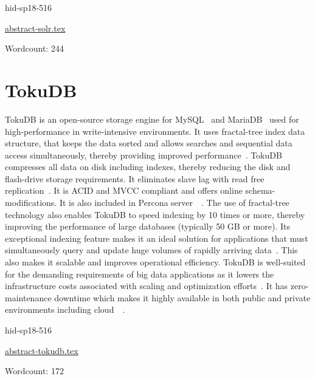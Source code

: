 \begin{IU}

hid-sp18-516

\href{https://github.com/cloudmesh-community/hid-sp18-516/blob/master//technology/abstract-solr.tex}{abstract-solr.tex}

 

Wordcount: 244

\end{IU}

\section{TokuDB}

TokuDB is an open-source storage engine for 
MySQL~\cite{hid-sp18-516-www-wiki-mysql} and 
MariaDB~\cite{hid-sp18-516-www-wiki-mariadb} used for high-performance in 
write-intensive environments. It uses fractal-tree index data structure, 
that keeps the data sorted and allows searches and sequential data access 
simultaneously, thereby providing improved 
performance~\cite{hid-sp18-516-www-wiki-tokudb}. TokuDB compresses all data 
on disk including indexes, thereby reducing the disk and flash-drive storage 
requirements. It eliminates slave lag with read free 
replication~\cite{hid-sp18-516-www-percona-server-tokudb}. It is ACID and MVCC
compliant and offers online schema-modifications. It is also included in
Percona 
server~\cite{hid-sp18-516-www-percona-tokudb}~\cite{hid-sp18-516-www-wiki-tokudb}. 
The use of fractal-tree technology also enables TokuDB to speed indexing by 10 
times or more, thereby improving the performance of large databases (typically 
50 GB or more). Its exceptional indexing feature makes it an ideal solution for 
applications that must simultaneously query and update huge volumes of rapidly 
arriving data~\cite{hid-sp18-516-www-blackbird-si}. This also makes it scalable 
and improves operational efficiency. TokuDB is well-suited for the demanding
requirements of big data applications as it lowers the infrastructure costs
associated with scaling and optimization
efforts~\cite{hid-sp18-516-www-percona-tokudb}. It has zero-maintenance downtime
which makes it highly available in both public and private environments
including
cloud~\cite{hid-sp18-516-www-percona-server-tokudb}~\cite{hid-sp18-516-www-percona-tokudb}.


\begin{IU}

hid-sp18-516

\href{https://github.com/cloudmesh-community/hid-sp18-516/blob/master//technology/abstract-tokudb.tex}{abstract-tokudb.tex}

 

Wordcount: 172

\end{IU}


